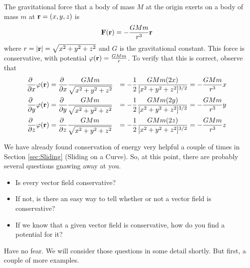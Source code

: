 \begin{eg}[Gravity]\label{eg:gravity}
The gravitational force that a body of mass $M$ at the origin
exerts on a body of mass $m$ at $\mathbf{r}=(x,y,z)$ is
\begin{equation*}
\mathbf{F}(\mathbf{r}) = -\frac{GMm}{r^3}\mathbf{r}
\end{equation*}
where $r=|\mathbf{r}|=\sqrt{x^2+y^2+z^2}$ and $G$ is the gravitational constant.
This force is conservative, with potential $\varphi(\mathbf{r}) = \frac{GMm}{r}$. 
To verify that this is correct, observe that
\begin{alignat*}{3}
\frac{\partial\ }{\partial x}\varphi(\mathbf{r})
   &=\frac{\partial\ }{\partial x}\frac{GMm}{\sqrt{x^2+y^2+z^2}}
   &=-\frac{1}{2}\frac{GMm(2x)}{[x^2+y^2+z^2]^{3/2}} 
   &=-\frac{GMm}{r^3}x \\ 
\frac{\partial\ }{\partial y}\varphi(\mathbf{r})
   &=\frac{\partial\ }{\partial y}\frac{GMm}{\sqrt{x^2+y^2+z^2}}
   &=-\frac{1}{2}\frac{GMm(2y)}{[x^2+y^2+z^2]^{3/2}} 
   &=-\frac{GMm}{r^3}y \\ 
\frac{\partial\ }{\partial z}\varphi(\mathbf{r})
   &=\frac{\partial\ }{\partial z}\frac{GMm}{\sqrt{x^2+y^2+z^2}}
   &=-\frac{1}{2}\frac{GMm(2z)}{[x^2+y^2+z^2]^{3/2}} 
   &=-\frac{GMm}{r^3}z  
\end{alignat*}
\end{eg}

We have already found conservation of energy very helpful 
a couple of times in Section \ref{sec:Sliding} (Sliding on a Curve).
So, at this point, there are probably several questions gnawing away at you.
\begin{itemize}
\item
Is every vector field conservative?

\item
If not, is there an easy way to tell whether or not a vector field 
is conservative?

\item
If we know that a given vector field is conservative, how do you find a potential for it?

\end{itemize}
Have no fear. We will consider those questions in some detail shortly.
But first, a couple of more examples. 



